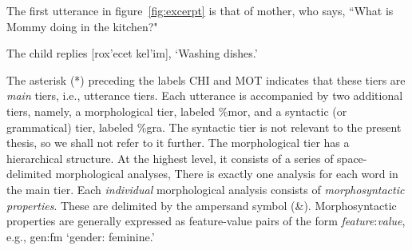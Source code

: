 The first utterance in figure~\ref{fig:excerpt} is that of mother,
who says, ``What is Mommy doing in the kitchen?" 

The child
replies \textsf{[rox\a'{e}cet kel\a'{i}m]}, `Washing dishes.'

The asterisk (*) 
preceding the labels CHI and \textsf{MOT} indicates 
that these tiers are \emph{main} tiers, i.e.,  
utterance tiers. Each utterance is accompanied by two additional tiers, 
namely, a morphological tier, labeled \textsf{\%mor}, and a syntactic 
(or grammatical) tier, labeled \textsf{\%gra}. 
The syntactic tier is not relevant to the present thesis,
so we shall not refer to it further.
The morphological 
tier has a hierarchical structure. At the highest level, it consists of a 
series of space-delimited morphological analyses, 
There is exactly one analysis for each word in the main tier.  
Each \emph{individual} morphological analysis consists
of \textit{morphosyntactic properties}. These are delimited by the ampersand symbol (\textsf{\&}). 
Morphosyntactic properties are 
generally expressed as feature-value pairs of the 
form \textsf{\textit{feature}:\textit{value}}, e.g., \textsf{gen:fm} `gender: feminine.'



